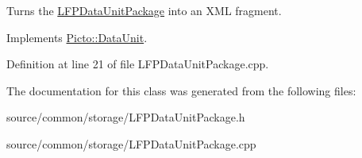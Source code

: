 Turns the \hyperlink{class_picto_1_1_l_f_p_data_unit_package}{L\-F\-P\-Data\-Unit\-Package} into an X\-M\-L fragment. 



Implements \hyperlink{class_picto_1_1_data_unit_a72923bddebee1127470ef9e8face7d3a}{Picto\-::\-Data\-Unit}.



Definition at line 21 of file L\-F\-P\-Data\-Unit\-Package.\-cpp.



The documentation for this class was generated from the following files\-:\begin{DoxyCompactItemize}
\item 
source/common/storage/L\-F\-P\-Data\-Unit\-Package.\-h\item 
source/common/storage/L\-F\-P\-Data\-Unit\-Package.\-cpp\end{DoxyCompactItemize}
